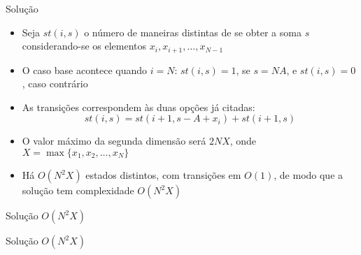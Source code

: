 \begin{frame}[fragile]{Solução}

    \begin{itemize}
        \item Seja $st(i, s)$ o número de maneiras distintas de se obter a soma $s$ considerando-se
            os elementos $x_i, x_{i + 1}, \ldots, x_{N - 1}$

        \item O caso base acontece quando $i = N$: $st(i, s) = 1$, se $s = NA$, e $st(i, s) = 0$,
            caso contrário

        \item As transições correspondem às duas opções já citadas:
        \[
            st(i, s) = st(i + 1, s - A + x_i) + st(i + 1, s)
        \]

        \item O valor máximo da segunda dimensão será $2NX$, onde $X = \max\{ x_1, x_2, \ldots, 
            x_N\}$

        \item Há $O(N^2X)$ estados distintos, com transições em $O(1)$, de modo que a solução
            tem complexidade $O(N^2X)$

    \end{itemize}

\end{frame}
\begin{frame}[fragile]{Solução $O(N^2X)$}
\end{frame}

\begin{frame}[fragile]{Solução $O(N^2X)$}
\end{frame}
